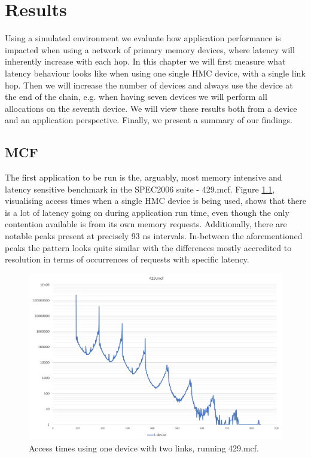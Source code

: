 \chapter{Results}
Using a simulated environment we evaluate how application performance is impacted when using a network of primary memory devices, where latency will inherently increase with each hop. In this chapter we will first measure what latency behaviour looks like when using one single HMC device, with a single link hop. Then we will increase the number of devices and always use the device at the end of the chain, e.g. when having seven devices we will perform all allocations on the seventh device. We will view these results both from a device and an application perspective. Finally, we present a summary of our findings.



\section{MCF}
The first application to be run is the, arguably, most memory intensive and latency sensitive benchmark in the SPEC2006 suite - 429.mcf. Figure \ref{Memory-access-429-single}, visualising access times when a single HMC device is being used, shows that there is a lot of latency going on during application run time, even though the only contention available is from its own memory requests. Additionally, there are notable peaks present at precisely 93 ns intervals. In-between the aforementioned peaks the pattern looks quite similar with the differences mostly accredited to resolution in terms of occurrences of requests with specific latency.
\bigskip

\begin{figure}[!ht]
    \centering
    \includegraphics[width=1.0\linewidth]{figure/429-x_4-1.jpg}
    \caption{Access times using one device with two links, running 429.mcf.}
    \label{Memory-access-429-single}
\end{figure}

